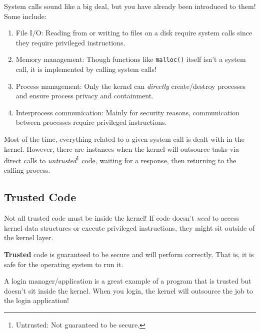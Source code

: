 \documentclass{report}
\begin{document}
\begin{tcolorbox}[colback=blue!5!white,colframe=black!75!blue,title=Example: System Call Stress] 
  System calls sound like a big deal, but you have already been introduced to them! Some include:
  \begin{enumerate}[label=\textit{(\roman*)}]
  \item File I/O: Reading from or writing to files on a disk require system calls since they require
    privileged instructions.
  \item Memory management: Though functions like \texttt{malloc()} itself isn't a system call, it is
    implemented by calling system calls!
  \item Process management: Only the kernel can \textit{directly} create/destroy processes and
    ensure process privacy and containment.
  \item Interprocess communication: Mainly for security reasons, communication between processes
    require privileged instructions.
  \end{enumerate}
\end{tcolorbox}

Most of the time, everything related to a given system call is dealt with in the kernel. However,
there are instances when the kernel will outsource tasks via direct calls to
\textit{untrusted}\footnote{Untrusted: Not guaranteed to be secure.}
code, waiting for a response, then returning to the calling process. 


\subsection{Trusted Code}
Not all trusted code must be inside the kernel! If code doesn't \textit{need} to access kernel data
structures or execute privileged instructions, they might sit outside of the kernel layer. 

\begin{tcolorbox}[title=Definition: Trust]
  \textbf{Trusted} code is guaranteed to be secure and will perform correctly. That is, it is safe
  for the operating system to run it.
\end{tcolorbox}


\begin{tcolorbox}[colback=blue!5!white,colframe=black!75!blue,title=Example: Lazy Login] 
  A login manager/application is a great example of a program that is trusted but doesn't sit inside
  the kernel. When you login, the kernel will outsource the job to the login application!
\end{tcolorbox}
\end{document}
